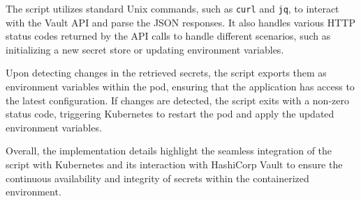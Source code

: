 The script utilizes standard Unix commands, such as \texttt{curl} and \texttt{jq}, to interact with the Vault API and parse the JSON responses. It also handles various HTTP status codes returned by the API calls to handle different scenarios, such as initializing a new secret store or updating environment variables.

Upon detecting changes in the retrieved secrets, the script exports them as environment variables within the pod, ensuring that the application has access to the latest configuration. If changes are detected, the script exits with a non-zero status code, triggering Kubernetes to restart the pod and apply the updated environment variables.

Overall, the implementation details highlight the seamless integration of the script with Kubernetes and its interaction with HashiCorp Vault to ensure the continuous availability and integrity of secrets within the containerized environment.
